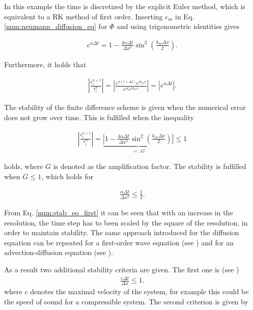 In this example the time is discretized by the explicit Euler method, which is equivalent to a RK method of first order.
Inserting $\epsilon_m$ in Eq. \ref{num:neumann_diffusion_eq} for $\Phi$ and using trigonometric identities  gives

\begin{align}
    e^{a \Delta t} = 1 -  \frac{4\alpha \Delta t}{\Delta x^2} \sin^2\left(\frac{k_m \Delta x}{2}\right).
\end{align}

Furthermore, it holds that

\begin{align}
    \left|\frac{\epsilon_i^{n+1}}{\epsilon_i^n}\right| =
    \left|\frac{e^{a(t + \Delta t)}e^{ik_mx}}{ e^{at}e^{ik_m x}}\right| = \left|e^{a\Delta t}\right|.
\end{align}

The stability of the finite difference scheme is given when the numerical error does not grow over time. This is fulfilled when the inequality

\begin{align}
    \label{num:stab_ineq}
    \left|\frac{\epsilon_i^{n+1}}{\epsilon_i^n}\right| =
    \underbrace{\left|1 -  \frac{4\alpha \Delta t}{\Delta x^2} \sin^2\left(\frac{k_m \Delta x}{2}\right)\right|}_{=:G} \leq 1
\end{align}

holds, where $G$ is denoted as the amplification factor. The stability is fulfilled when $G\leq1$, which holds for

\begin{align}
    \label{num:stab_eq_first}
   \frac{\alpha \Delta t}{\Delta x^2} \leq \frac{1}{2}.
\end{align}

From Eq. \ref{num:stab_eq_first} it can be seen that with an increase in the resolution,
the time step has to been scaled by the square of the resolution, in order to
maintain stability. The same approach introduced for the diffusion equation can be repeated for a first-order wave equation (see \citep{janderson})
and for an advection-diffusion equation (see \citep{ferziger99}).

As a result two additional stability criteria are given.
The first one is (see \citep{janderson})
\begin{align}
    \label{num:stab_soundspeed}
   \frac{c \Delta t}{\Delta x} \leq 1.
\end{align}
where $c$ denotes the maximal velocity of the system, for example this could be the speed of sound for a compressible system.
The second criterion is given by

